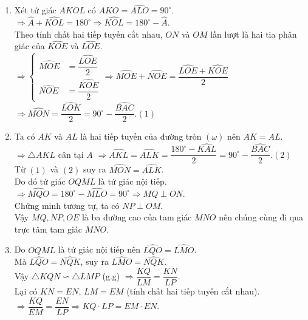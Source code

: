 \begin{ex}
{\begin{center}
    \end{center}
    \begin{enumerate}
        \item Xét tứ giác $AKOL$ có $\widehat{AKO}=\widehat{ALO}=90^\circ$.\\
        $\Rightarrow \widehat{A}+\widehat{KOL}=180^\circ\Rightarrow \widehat{KOL}=180^\circ -\widehat{A}$.\\
        Theo tính chất hai tiếp tuyến cắt nhau, $ON$ và $OM$ lần lượt là hai tia phân giác của $\widehat{KOE}$ và $\widehat{LOE}$.\\
        $\Rightarrow \begin{cases}
        \widehat{MOE}&=\dfrac{\widehat{LOE}}{2}\\[0.2cm]
        \widehat{NOE}&=\dfrac{\widehat{KOE}}{2}
        \end{cases} \Rightarrow \widehat{MOE}+\widehat{NOE}=\dfrac{\widehat{LOE}+\widehat{KOE}}{2}$\\
        $\Rightarrow \widehat{MON}=\dfrac{\widehat{LOK}}{2}=90^\circ-\dfrac{\widehat{BAC}}{2}.$\hfill $(1)$
        \item Ta có $AK$ và $AL$ là hai tiếp tuyến của đường tròn $(\omega)$ nên $AK=AL$.\\
        $\Rightarrow \triangle AKL$ cân tại $A$ $\Rightarrow \widehat{AKL}=\widehat{ALK}=\dfrac{180^\circ-\widehat{KAL}}{2}=90^\circ-\dfrac{\widehat{BAC}}{2}.$\hfill $(2)$\\
        Từ $(1)$ và $(2)$ suy ra $\widehat{MON}=\widehat{ALK}$.\\
        Do đó tứ giác $OQML$ là tứ giác nội tiếp.\\
        $\Rightarrow \widehat{MQO}=180^\circ-\widehat{MLO}=90^\circ\Rightarrow MQ\perp ON$.\\
        Chứng minh tương tự, ta có $NP\perp OM$.\\
        Vậy $MQ, NP, OE$ là ba đường cao của tam giác $MNO$ nên chúng cùng đi qua trực tâm tam giác $MNO$.
        \item Do $OQML$ là tứ giác nội tiếp nên $\widehat{LQO}=\widehat{LMO}$.\\
        Mà $\widehat{LQO}=\widehat{NQK}$, suy ra $\widehat{LMO}=\widehat{NQK}$.\\
        Vậy $\triangle KQN\backsim \triangle LMP$ (g.g) $\Rightarrow \dfrac{KQ}{LM}=\dfrac{KN}{LP}$.\\
        Lại có $KN=EN$, $LM=EM$ (tính chất hai tiếp tuyến cắt nhau).\\
        $\Rightarrow \dfrac{KQ}{EM}=\dfrac{EN}{LP}\Rightarrow KQ\cdot LP=EM\cdot EN$.
    \end{enumerate}
    }
\end{ex}

